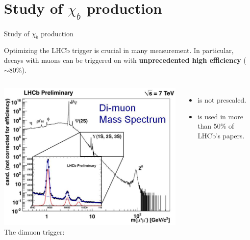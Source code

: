 \documentclass{beamer}
\begin{document}
\section{Study of $\chi_{b}$ production}
\begin{frame}
\begin{exampleblock}{}
    \begin{center}
        {\huge Study of $\chi_{b}$ production}
    \end{center}
\end{exampleblock}
\end{frame}
\begin{frame}
Optimizing the LHCb trigger is crucial in many measurement. In particular,
decays with muons can be triggered on with \textbf{unprecedented high efficiency} ($\sim$80\%).
\begin{columns}[c]
\includegraphics[width=\textwidth]{images/mumu.png}
The dimuon trigger:

\begin{itemize}
  \item is not prescaled.
  \item is used in more than 50\% of LHCb's papers.
\end{itemize}
\end{columns}
\end{frame}
\end{document}

